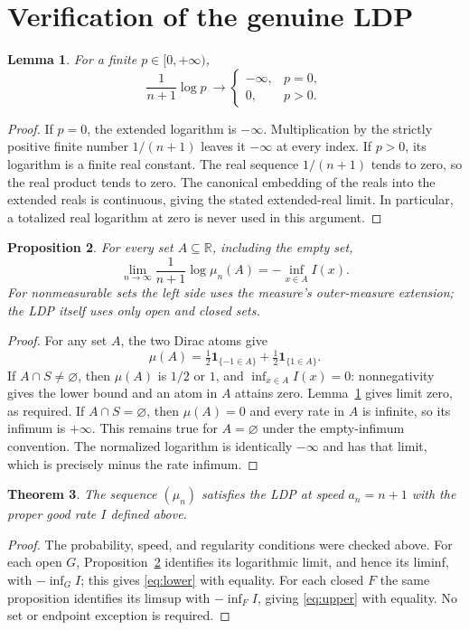 \documentclass[11pt]{article}
\newtheorem{theorem}{Theorem}
\newtheorem{lemma}[theorem]{Lemma}
\newtheorem{proposition}[theorem]{Proposition}
\newcommand{\R}{\mathbb R}
\begin{document}
\section{Verification of the genuine LDP}

\begin{lemma}\label{lem:log}
For a finite $p\in[0,+\infty)$,
\[
 \frac{1}{n+1}\log p\ \longrightarrow
 \begin{cases}-\infty,&p=0,\\0,&p>0.\end{cases}
\]
\end{lemma}
\begin{proof}
If $p=0$, the extended logarithm is $-\infty$. Multiplication by the strictly
positive finite number $1/(n+1)$ leaves it $-\infty$ at every index.
If $p>0$, its logarithm is a finite real constant. The real sequence
$1/(n+1)$ tends to zero, so the real product tends to zero. The canonical
embedding of the reals into the extended reals is continuous, giving the
stated extended-real limit. In particular, a totalized real logarithm at
zero is never used in this argument.
\end{proof}

\begin{proposition}\label{prop:eventwise}
For every set $A\subseteq\R$, including the empty set,
\[
 \lim_{n\to\infty}\frac{1}{n+1}\log\mu_n(A)
 =-\inf_{x\in A} I(x).
\]
For nonmeasurable sets the left side uses the measure's outer-measure
extension; the LDP itself uses only open and closed sets.
\end{proposition}
\begin{proof}
For any set $A$, the two Dirac atoms give
\[
 \mu(A)=\tfrac12\mathbf1_{\{-1\in A\}}
       +\tfrac12\mathbf1_{\{1\in A\}}.
\]
If $A\cap S\ne\varnothing$, then $\mu(A)$ is $1/2$ or $1$, and
$\inf_{x\in A}I(x)=0$: nonnegativity gives the lower bound and an atom in
$A$ attains zero. Lemma~\ref{lem:log} gives limit zero, as required.
If $A\cap S=\varnothing$, then $\mu(A)=0$ and every rate in $A$ is infinite,
so its infimum is $+\infty$. This remains true for $A=\varnothing$ under the
empty-infimum convention. The normalized logarithm is identically
$-\infty$ and has that limit, which is precisely minus the rate infimum.
\end{proof}

\begin{theorem}\label{thm:ldp}
The sequence $(\mu_n)$ satisfies the LDP at speed $a_n=n+1$ with the proper
good rate $I$ defined above.
\end{theorem}
\begin{proof}
The probability, speed, and regularity conditions were checked above.
For each open $G$, Proposition~\ref{prop:eventwise} identifies its logarithmic
limit, and hence its liminf, with $-\inf_G I$; this gives
\eqref{eq:lower} with equality. For each closed $F$ the same proposition
identifies its limsup with $-\inf_F I$, giving \eqref{eq:upper} with equality.
No set or endpoint exception is required.
\end{proof}
\end{document}
